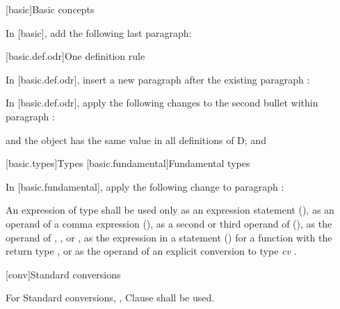 
[basic]{Basic concepts}

\pnum
In {\cppstddocno} [basic], add the following last paragraph:

\begin{std.txt}
\end{std.txt}



\setcounter{section}{1}
[basic.def.odr]{One definition rule}

\pnum
In {\cppstddocno} [basic.def.odr], insert a new paragraph after the existing paragraph :

\begin{std.txt}
\end{std.txt}

\pnum
In {\cppstddocno} [basic.def.odr], apply the following changes to the second bullet within paragraph :

\begin{std.txt}
and the object has the same value in all definitions of D; and
\end{std.txt}

\setcounter{section}{8}
[basic.types]{Types}
[basic.fundamental]{Fundamental types}

\pnum
In {\cppstddocno} [basic.fundamental], apply the following change to paragraph :

\begin{std.txt}
An expression of type  shall be used only as an expression
statement (), as an operand of a comma expression
(), as a second or
third operand of  (), as the operand of ,
,  or , as the
expression in a  statement () for a function with the return type
, or as the operand of an explicit conversion to type
\emph{cv} .
\end{std.txt}

[conv]{Standard conversions}

For Standard conversions, {\cppstddocno}, Clause \the\value{chapter} shall be used.

